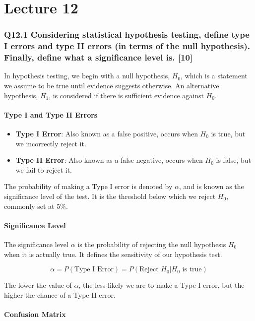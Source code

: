 \documentclass[11pt]{article}
\begin{document}
\part{Lecture 12}

\section{Q12.1 Considering statistical hypothesis testing, define type I errors and type II errors (in terms of the null hypothesis). Finally, define what a significance level is. [10]}

In hypothesis testing, we begin with a null hypothesis, $H_0$, which is a statement we assume to be true until evidence suggests otherwise. An alternative hypothesis, $H_1$, is considered if there is sufficient evidence against $H_0$.

\subsection*{Type I and Type II Errors}

\begin{itemize}
    \item \textbf{Type I Error}: Also known as a false positive, occurs when $H_0$ is true, but we incorrectly reject it.
    \item \textbf{Type II Error}: Also known as a false negative, occurs when $H_0$ is false, but we fail to reject it.
\end{itemize}

The probability of making a Type I error is denoted by $\alpha$, and is known as the significance level of the test. It is the threshold below which we reject $H_0$, commonly set at 5\%.

\subsection*{Significance Level}

The significance level $\alpha$ is the probability of rejecting the null hypothesis $H_0$ when it is actually true. It defines the sensitivity of our hypothesis test.

\[
    \alpha = P(\text{Type I Error}) = P(\text{Reject } H_0 | H_0 \text{ is true})
\]

The lower the value of $\alpha$, the less likely we are to make a Type I error, but the higher the chance of a Type II error.

\subsection*{Confusion Matrix}
\end{document}
